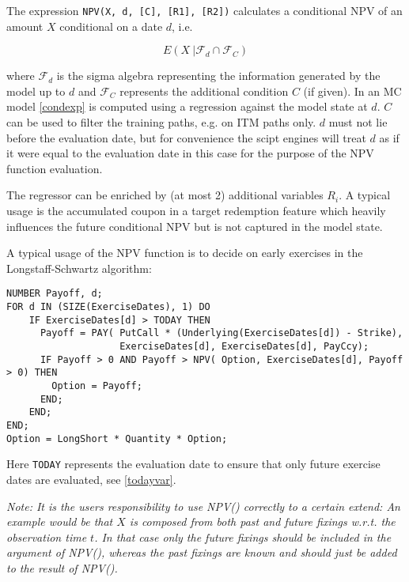 \label{function_npv}

The expression {\tt NPV(X, d, [C], [R1], [R2])} calculates a conditional NPV of an amount $X$ conditional on a date $d$, i.e.

\begin{equation}\label{condexp}
  E( X\: | \mathcal{F}_d \cap \mathcal{F}_C )
\end{equation}

where $\mathcal{F}_d$ is the sigma algebra representing the information generated by the model up to $d$ and
$\mathcal{F}_C$ represents the additional condition $C$ (if given). In an MC model \ref{condexp} is computed using a
regression against the model state at $d$. $C$ can be used to filter the training paths, e.g. on ITM paths only. $d$
must not lie before the evaluation date, but for convenience the scipt engines will treat $d$ as if it were equal to the
evaluation date in this case for the purpose of the NPV function evaluation.

The regressor can be enriched by (at most 2) additional variables $R_i$. A typical usage is the accumulated coupon in a
target redemption feature which heavily influences the future conditional NPV but is not captured in the model state.

A typical usage of the NPV function is to decide on early exercises in the Longstaff-Schwartz algorithm:

\begin{verbatim}
NUMBER Payoff, d;
FOR d IN (SIZE(ExerciseDates), 1) DO
    IF ExerciseDates[d] > TODAY THEN
      Payoff = PAY( PutCall * (Underlying(ExerciseDates[d]) - Strike),
                    ExerciseDates[d], ExerciseDates[d], PayCcy);
      IF Payoff > 0 AND Payoff > NPV( Option, ExerciseDates[d], Payoff > 0) THEN
        Option = Payoff;
      END;
    END;
END;
Option = LongShort * Quantity * Option;
\end{verbatim}

Here \verb+TODAY+ represents the evaluation date to ensure that only future exercise dates are evaluated, see
\ref{todayvar}.

{\em Note: It is the users responsibility to use NPV() correctly to a certain extend: An example would be that $X$ is
  composed from both past and future fixings w.r.t. the observation time $t$. In that case only the future fixings
  should be included in the argument of NPV(), whereas the past fixings are known and should just be added to the result
  of NPV().}

